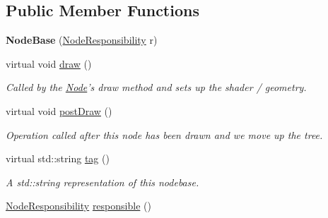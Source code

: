 \subsection*{Public Member Functions}
\begin{DoxyCompactItemize}
\item 
\hypertarget{classs9_1_1NodeBase_ac8f09948fe574391a955908cb687ad9d}{{\bfseries Node\-Base} (\hyperlink{namespaces9_a5c291cd938e865ef990a7f53eec62f36}{Node\-Responsibility} r)}\label{classs9_1_1NodeBase_ac8f09948fe574391a955908cb687ad9d}

\item 
\hypertarget{classs9_1_1NodeBase_aee4bb01fa74d9e7a3e5b95ed8ce34976}{virtual void \hyperlink{classs9_1_1NodeBase_aee4bb01fa74d9e7a3e5b95ed8ce34976}{draw} ()}\label{classs9_1_1NodeBase_aee4bb01fa74d9e7a3e5b95ed8ce34976}

\begin{DoxyCompactList}\small\item\em Called by the \hyperlink{classs9_1_1Node}{Node}'s draw method and sets up the shader / geometry. \end{DoxyCompactList}\item 
\hypertarget{classs9_1_1NodeBase_a1fc0f9d1738fa4382000e25f782df736}{virtual void \hyperlink{classs9_1_1NodeBase_a1fc0f9d1738fa4382000e25f782df736}{post\-Draw} ()}\label{classs9_1_1NodeBase_a1fc0f9d1738fa4382000e25f782df736}

\begin{DoxyCompactList}\small\item\em Operation called after this node has been drawn and we move up the tree. \end{DoxyCompactList}\item 
\hypertarget{classs9_1_1NodeBase_a702c8c1d5991c2c0ac09dc2449eb64d7}{virtual std\-::string \hyperlink{classs9_1_1NodeBase_a702c8c1d5991c2c0ac09dc2449eb64d7}{tag} ()}\label{classs9_1_1NodeBase_a702c8c1d5991c2c0ac09dc2449eb64d7}

\begin{DoxyCompactList}\small\item\em A std\-::string representation of this nodebase. \end{DoxyCompactList}\item 
\hypertarget{classs9_1_1NodeBase_a2804e1d019079ae481d437e2b3cb205c}{\hyperlink{namespaces9_a5c291cd938e865ef990a7f53eec62f36}{Node\-Responsibility} \hyperlink{classs9_1_1NodeBase_a2804e1d019079ae481d437e2b3cb205c}{responsible} ()}\label{classs9_1_1NodeBase_a2804e1d019079ae481d437e2b3cb205c}


\end{DoxyCompactItemize}
